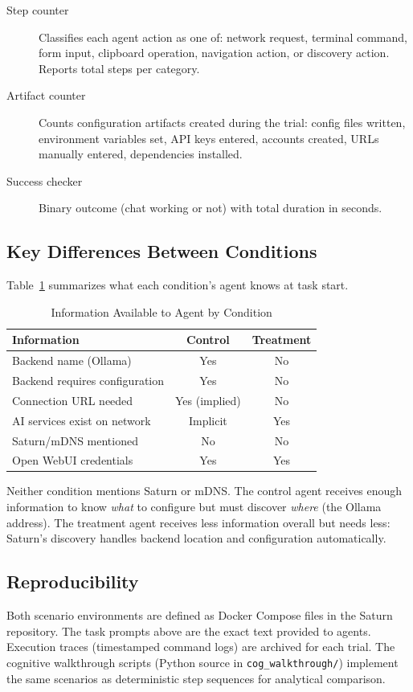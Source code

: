 \begin{description}
\item[Step counter] Classifies each agent action as one of: network request, terminal command, form input, clipboard operation, navigation action, or discovery action. Reports total steps per category.
\item[Artifact counter] Counts configuration artifacts created during the trial: config files written, environment variables set, API keys entered, accounts created, URLs manually entered, dependencies installed.
\item[Success checker] Binary outcome (chat working or not) with total duration in seconds.
\end{description}

\subsection{Key Differences Between Conditions}

Table~\ref{tab:scenario-diff} summarizes what each condition's agent knows at task start.

\begin{table}[ht]
\centering
\caption{Information Available to Agent by Condition}
\label{tab:scenario-diff}
\begin{tabular}{l c c}
\hline
\textbf{Information} & \textbf{Control} & \textbf{Treatment} \\
\hline
Backend name (Ollama) & Yes & No \\
Backend requires configuration & Yes & No \\
Connection URL needed & Yes (implied) & No \\
AI services exist on network & Implicit & Yes \\
Saturn/mDNS mentioned & No & No \\
Open WebUI credentials & Yes & Yes \\
\hline
\end{tabular}
\end{table}

Neither condition mentions Saturn or mDNS. The control agent receives enough information to know \textit{what} to configure but must discover \textit{where} (the Ollama address). The treatment agent receives less information overall but needs less: Saturn's discovery handles backend location and configuration automatically.

\subsection{Reproducibility}

Both scenario environments are defined as Docker Compose files in the Saturn repository. The task prompts above are the exact text provided to agents. Execution traces (timestamped command logs) are archived for each trial. The cognitive walkthrough scripts (Python source in \texttt{cog\_walkthrough/}) implement the same scenarios as deterministic step sequences for analytical comparison.
